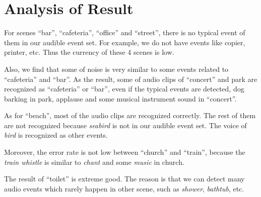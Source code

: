 \begin{table}[!htbp]
\centering
{}
\caption{Confusion Matrix of 10 Scene Recognition}
\end{table}

\section{Analysis of Result}
For scenes ``bar'', ``cafeteria'', ``office'' and ``street'', there is no typical event of them in our audible event set. For example, we do not have events like copier, printer, etc. Thus the currency of these 4 scenes is low. 

Also, we find that some of noise is very similar to some events related to ``cafeteria'' and ``bar''. As the result, some of audio clips of ``concert'' and park are recognized as ``cafeteria'' or ``bar'', even if the typical events are detected, \eg dog barking in park, applause and some musical instrument sound in ``concert''.

As for ``beach'', most of the audio clips are recognized correctly. The rest of them are not recognized because {\em seabird} is not in our audible event set. The voice of {\em bird} is recognized as other events.

Moreover, the error rate is not low between ``church'' and ``train'', because the {\em train whistle} is similar to {\em chant} and some {\em music} in church.

The result of ``toilet'' is extreme good. The reason is that we can detect many audio events which rarely happen in other scene, such as {\em shower}, {\em bathtub}, etc.

